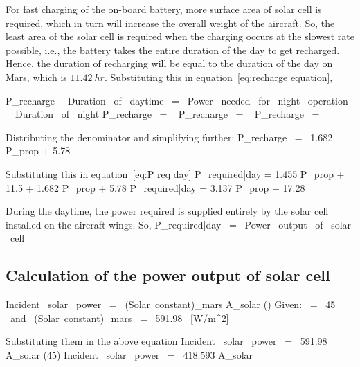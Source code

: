\p For fast charging of the on-board battery, more surface area of solar cell is required, which in turn will increase the overall weight of the aircraft. So, the least area of the solar cell is required when the charging occurs at the slowest rate possible, i.e., the battery takes the entire duration of the day to get recharged. Hence, the duration of recharging will be equal to the duration of the day on Mars, which is $ 11.42 \ hr $. Substituting this in equation~\ref{eq:recharge equation},

\mb P_{recharge} \ \times \ Duration \ of \ daytime \ = \ Power \ needed \ for \ night \ operation \ \times \ Duration \ of \ night \me
\mb P_{recharge} \ = \  \me
\mb P_{recharge} \ = \  \quad [W] \me
\mb P_{recharge} \ = \  \quad [W] \me

Distributing the denominator and simplifying further:
\mb P_{recharge} \ = \ 1.682 \cdot P_{prop} + 5.78 \quad [W] \me

Substituting this in equation~\ref{eq:P req day}
\mb P_{required|day} = 1.455 \cdot P_{prop} + 11.5 + 1.682 \cdot P_{prop} + 5.78 \quad [W] \me
\mb P_{required|day} = 3.137 \cdot P_{prop} + 17.28 \quad [W] \me

\p During the daytime, the power required is supplied entirely by the solar cell installed on the aircraft wings. So,
\me P_{required|day} \ = \ Power \ output \ of \ solar \ cell \me

\subsection{Calculation of the power output of solar cell}

\mb Incident \ solar \ power \ = \ (Solar\ constant)_{mars} \times A_{solar} \times \cos(\theta) \me
{}
Given:
\mb \theta \ = \ 45 \textdegree \ and \  (Solar\ constant)_{mars} \ = \ 591.98 \ [W/m^2] \me

Substituting them in the above equation
\mb Incident \ solar \ power \ = \ 591.98 \times A_{solar} \times \cos(45\textdegree) \quad [W] \me
\mb Incident \ solar \ power \ = \ 418.593 \times A_{solar} \quad [W] \me

